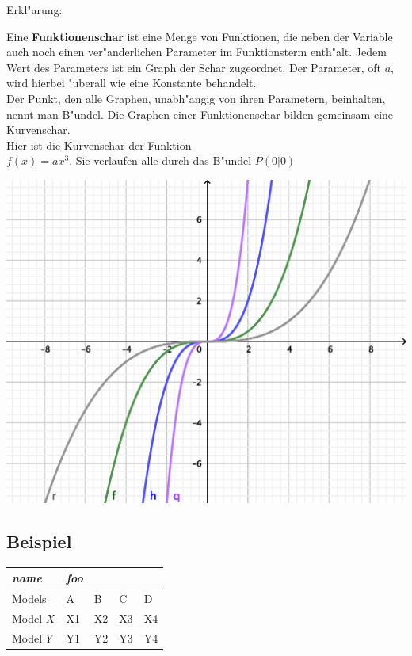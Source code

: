 Erkl"arung:\\

\begin{minipage}[b]{0.5\linewidth}
Eine \textbf{Funktionenschar} ist eine Menge von Funktionen, die neben der Variable auch noch einen ver"anderlichen Parameter im Funktionsterm enth"alt. Jedem Wert des Parameters ist ein Graph der Schar zugeordnet. Der Parameter, oft $a$, wird hierbei "uberall wie eine Konstante behandelt.\\
Der Punkt, den alle Graphen, unabh"angig von ihren Parametern, beinhalten, nennt man B"undel. Die Graphen einer
Funktionenschar bilden gemeinsam eine Kurvenschar.\\
Hier ist die Kurvenschar der Funktion\\ $f(x)=ax^3$. Sie verlaufen alle durch das B"undel $P(0|0)$
\end{minipage}
\hfill
\begin{minipage}[b]{0.4\linewidth}
\includegraphics[height=12\baselineskip]{kap3/BundelFunktionenscharen.eps}
\end{minipage}

\subsection{Beispiel}

\begin{tabular}{@{} *5l @{}}    \toprule
\emph{name} & \emph{foo} &&&  \\\midrule
Models    & A  & B  & C  & D  \\ 
 Model $X$ & X1 & X2 & X3 & X4\\ 
 Model $Y$ & Y1 & Y2 & Y3 & Y4\\\bottomrule
 \hline
\end{tabular}